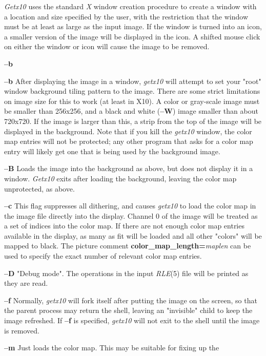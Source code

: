 {\it Getx10}
uses the standard 
{\it X}
window creation procedure to create a window with a location and size
specified by the user, with the restriction that the window must be at
least as large as the input image.  If the window is turned into an
icon, a smaller version of the image will be displayed in the icon.  A
shifted mouse click on either the window or icon will cause the image
to be removed.
\begin{TPlist}{{\bf --b}}
\item[{{\bf --b}}]
After displaying the image in a window, 
{\it getx10}
will attempt to set your "root" window background tiling pattern to
the image.  There are some strict limitations on image size for this
to work (at least in X10).  A color or gray-scale image must be
smaller than 256x256, and a black and white 
{\rm (}{\bf --W}{\rm )}
image smaller than
about 720x720.  If the image is larger than this, a strip from the top
of the image will be displayed in the background.  Note that if you
kill the 
{\it getx10}
window, the color map entries will not be protected; any other program
that asks for a color map entry will likely get one that is being used
by the background image.
\item[{{\bf --B}}]
Loads the image into the background as above, but does not display it
in a window.
{\it Getx10}
exits after loading the background, leaving the color map unprotected,
as above.
\item[{{\bf --c}}]
This flag suppresses all dithering, and causes
{\it getx10}
to load the color map in the image file directly into the display.
Channel 0 of the image will be treated as a set of indices into the
color map.  If there are not enough color map entries available in the
display, as many as fit will be loaded and all other "colors" will be
mapped to black.  The picture comment 
{\bf color\_map\_length=}{\it maplen}
can be used to specify the exact number of relevant color map entries.
\item[{{\bf --D}}]
"Debug mode".  The operations in the input
{\it RLE}{\rm (5)}
file will be printed as they are read.
\item[{{\bf --f}}]
Normally,
{\it getx10}
will fork itself after putting the image on the screen, so that the
parent process may return the shell, leaving an "invisible" child to
keep the image refreshed.  If 
{\bf --f}
is specified, 
{\it getx10}
will not exit to the shell until the image is removed.
\item[{{\bf --m}}]
Just loads the color map.  This may be suitable for fixing up the

\end{TPlist}
